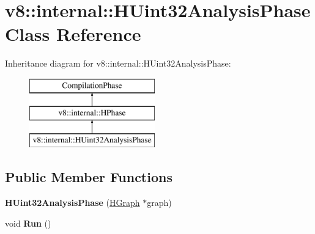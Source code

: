 \hypertarget{classv8_1_1internal_1_1_h_uint32_analysis_phase}{}\section{v8\+:\+:internal\+:\+:H\+Uint32\+Analysis\+Phase Class Reference}
\label{classv8_1_1internal_1_1_h_uint32_analysis_phase}
Inheritance diagram for v8\+:\+:internal\+:\+:H\+Uint32\+Analysis\+Phase\+:\begin{figure}[H]
\begin{center}
\leavevmode
\includegraphics[height=3.000000cm]{classv8_1_1internal_1_1_h_uint32_analysis_phase}
\end{center}
\end{figure}
\subsection*{Public Member Functions}
\begin{DoxyCompactItemize}
\item 
{\bfseries H\+Uint32\+Analysis\+Phase} (\hyperlink{classv8_1_1internal_1_1_h_graph}{H\+Graph} $\ast$graph)\hypertarget{classv8_1_1internal_1_1_h_uint32_analysis_phase_a7bcb34094c72261b94aa89ed61afa7ce}{}\label{classv8_1_1internal_1_1_h_uint32_analysis_phase_a7bcb34094c72261b94aa89ed61afa7ce}

\item 
void {\bfseries Run} ()\hypertarget{classv8_1_1internal_1_1_h_uint32_analysis_phase_a733477b631c72e34fdf845765efb826d}{}\label{classv8_1_1internal_1_1_h_uint32_analysis_phase_a733477b631c72e34fdf845765efb826d}

\end{DoxyCompactItemize}
